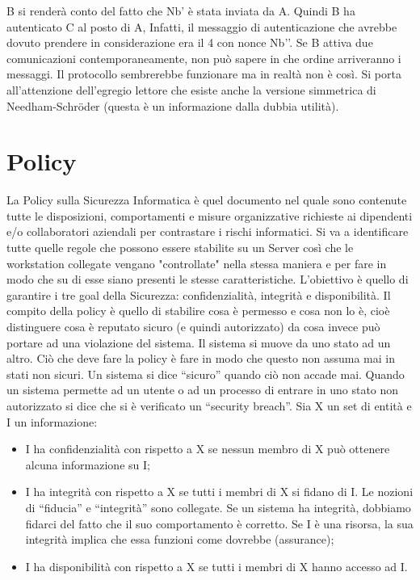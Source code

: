 B si renderà conto del fatto che Nb’ è stata inviata da A. Quindi B ha 
autenticato C al posto di A,
Infatti, il messaggio di autenticazione che avrebbe dovuto prendere in 
considerazione era il 4 con
nonce Nb’’.
Se B attiva due comunicazioni contemporaneamente, non può sapere in che 
ordine arriveranno i
messaggi.
Il protocollo sembrerebbe funzionare ma in realtà non è così.
Si porta all'attenzione dell'egregio lettore che esiste anche la versione
simmetrica di Needham-Schröder (questa è un informazione dalla
dubbia utilità).

\section{Policy}
La Policy sulla Sicurezza Informatica è quel documento nel quale sono 
contenute tutte le
disposizioni, comportamenti e misure organizzative richieste ai dipendenti 
e/o collaboratori
aziendali per contrastare i rischi informatici. Si va a identificare tutte 
quelle regole che possono
essere stabilite su un Server così che le workstation collegate vengano 
"controllate" nella stessa
maniera e per fare in modo che su di esse siano presenti le stesse 
caratteristiche.
L’obiettivo è quello di garantire i tre goal della Sicurezza: 
confidenzialità, integrità e disponibilità.
Il compito della policy è quello di stabilire cosa è permesso e cosa non 
lo è, cioè distinguere cosa è
reputato sicuro (e quindi autorizzato) da cosa invece può portare ad una
violazione del sistema. Il
sistema si muove da uno stato ad un altro. Ciò che deve fare la policy è 
fare in modo che questo
non assuma mai in stati non sicuri. Un sistema si dice “sicuro” quando ciò 
non accade mai.
Quando un sistema permette ad un utente o ad un processo di entrare in uno 
stato non autorizzato
si dice che si è verificato un “security breach”.
Sia X un set di entità e I un informazione:
\begin{itemize}
    \item I ha confidenzialità con rispetto a X se nessun membro di X può
          ottenere alcuna
          informazione su I;
    \item I ha integrità con rispetto a X se tutti i membri di X si fidano
          di I. Le nozioni di “fiducia” e
          “integrità” sono collegate. Se un sistema ha integrità, dobbiamo 
          fidarci del fatto che il suo
          comportamento è corretto. Se I è una risorsa, la sua integrità implica 
          che essa funzioni
          come dovrebbe (assurance);
    \item I ha disponibilità con rispetto a X se tutti i membri di X hanno
          accesso ad I.
\end{itemize}


